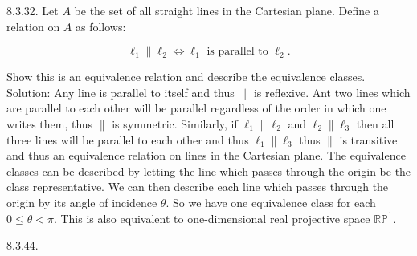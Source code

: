 \documentclass[10 pt]{amsart}
\theoremstyle{definition}
\theoremstyle{remark}
\numberwithin{equation}{subsection}
\newcommand{\R}{\mathbb{R}}
\begin{document}
8.3.32. Let $A$ be the set of all straight lines in the Cartesian plane.  Define a relation on $A$ as follows:

\[
\ell_1 \parallel \ell_2 \Longleftrightarrow \ell_1 \text{ is parallel to } \ell_2.
\]


Show this is an equivalence relation and describe the equivalence classes.\\

Solution:  Any line is parallel to itself and thus $\parallel$ is reflexive.  Ant two lines which are parallel to each other will be parallel regardless of the order in which one writes them, thus $\parallel$ is symmetric.  Similarly, if $\ell_1 \parallel \ell_2$ and $\ell_2 \parallel \ell_3$ then all three lines will be parallel to each other and thus $\ell_1 \parallel \ell_3$ thus $\parallel$ is transitive and thus an equivalence relation on lines in the Cartesian plane.  The equivalence classes can be described by letting the line which passes through the origin be the class representative.  We can then describe each line which passes through the origin by its angle of incidence $\theta$.  So we have one equivalence class for each $0 \leq \theta < \pi$.  This is also equivalent to one-dimensional real projective space $\R\mathbb{P}^1$.

\newpage

8.3.44. 
\end{document}
